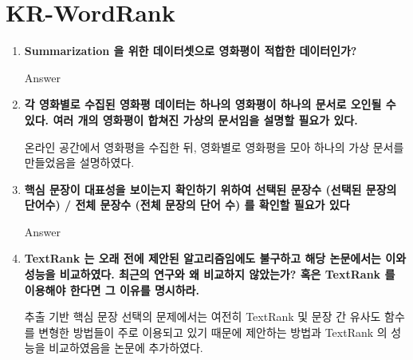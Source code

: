 \documentclass[11pt]{article}
\begin{document}
\section{KR-WordRank}
\begin{enumerate}
\item \textbf{Summarization 을 위한 데이터셋으로 영화평이 적합한 데이터인가?}

Answer

\item \textbf{각 영화별로 수집된 영화평 데이터는 하나의 영화평이 하나의 문서로 오인될 수 있다. 여러 개의 영화평이 합쳐진 가상의 문서임을 설명할 필요가 있다.}

온라인 공간에서 영화평을 수집한 뒤, 영화별로 영화평을 모아 하나의 가상 문서를 만들었음을 설명하였다.

\item \textbf{핵심 문장이 대표성을 보이는지 확인하기 위하여 선택된 문장수 (선택된 문장의 단어수) / 전체 문장수 (전체 문장의 단어 수) 를 확인할 필요가 있다}

Answer

\item \textbf{TextRank 는 오래 전에 제안된 알고리즘임에도 불구하고 해당 논문에서는 이와 성능을 비교하였다. 최근의 연구와 왜 비교하지 않았는가? 혹은 TextRank 를 이용해야 한다면 그 이유를 명시하라.}

추출 기반 핵심 문장 선택의 문제에서는 여전히 TextRank 및 문장 간 유사도 함수를 변형한 방법들이 주로 이용되고 있기 때문에 제안하는 방법과 TextRank 의 성능을 비교하였음을 논문에 추가하였다.

\end{enumerate}
\end{document}
